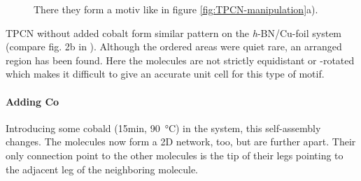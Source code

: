   \begin{figure}[!h]
  	\centering
  	\caption{There they form a motiv like in figure \ref{fig:TPCN-manipulation}a).}
  \end{figure}
  
  TPCN without added cobalt form similar pattern on the \textit{h}-BN/Cu-foil system (compare fig. 2b in \cite{urgel_controlling_2015}). Although the ordered areas were quiet rare, an arranged region has been found. Here the molecules are not strictly equidistant or -rotated which makes it difficult to give an accurate unit cell for this type of motif.
  
  \paragraph{Adding Co}
  Introducing some cobald (15min, \SI{90}{\celsius}) in the system, this self-assembly changes. The molecules now form a 2D network, too, but are further apart. Their only connection point to the other molecules is the tip of their legs pointing to the adjacent leg of the neighboring molecule.
  
